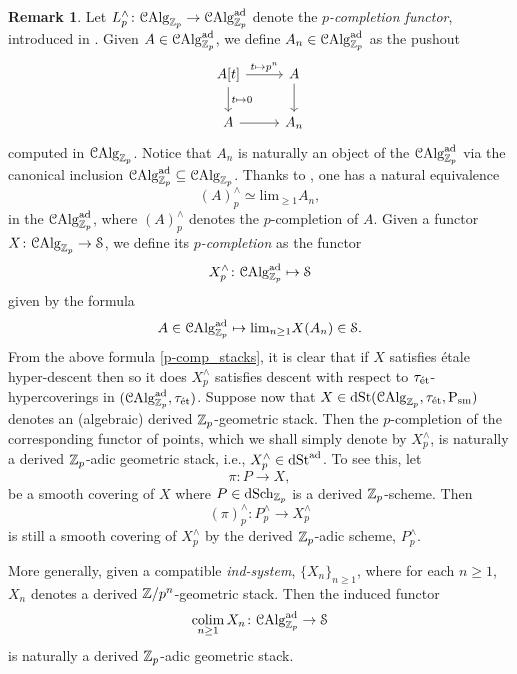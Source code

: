\documentclass[10pt,a4paper]{amsart}
\numberwithin{equation}{subsection}
\theoremstyle{definition}
\newtheorem{remark}[theorem]{Remark}
\def\lim{\mathrm{lim}}
\begin{document}
\begin{remark}
    Let $
            L_p^\wedge \colon \mathcal{C}\mathrm{Alg}_{\mathbb Z_p} \to \mathcal C \mathrm{Alg}^{\mathrm{ad}}_{\mathbb Z_p}
        $
    denote the \emph{$p$-completion functor}, introduced in \cite[\S 8]{lurie2016spectral}. Given $A \in \mathcal C \mathrm{Alg}^{\mathrm{ad}}_{\mathbb Z_p}$, we define $A_n \in \mathcal C \mathrm{Alg}^{\mathrm{ad}}_{\mathbb Z_p}$ as the pushout
        \[
        \begin{tikzcd}
            A[t] \ar{r}{t \mapsto p^n} \ar{d}{t \mapsto 0} & A \ar{d} \\
            A \ar{r} & A_n
        \end{tikzcd}
        \]    
    computed in \infcat $\mathcal{C}\mathrm{Alg}_{\mathbb Z_p}$. Notice that $A_n$ is naturally an object of the \infcat $\mathcal C \mathrm{Alg}^{\mathrm{ad}}_{\mathbb Z_p}$ via the canonical inclusion $\mathcal C \mathrm{Alg}^{\mathrm{ad}}_{\mathbb Z_p} \subseteq \mathcal{C}\mathrm{Alg}_{\mathbb Z_p}$.
    Thanks to \cite[Lemma 8.1.2.3]{lurie2016spectral}, one has a natural equivalence
        \[
            (A)^\wedge_p \simeq \lim_{\geq 1} A_n,  
        \]
    in the \infcat $\mathcal C \mathrm{Alg}^{\mathrm{ad}}_{\mathbb Z_p}$, where $(A)^\wedge_p$ denotes the $p$-completion of $A$.
    Given a functor $X \colon \mathcal{C}\mathrm{Alg}_{\mathbb Z_p} \to \mathcal S$, we define its \emph{$p$-completion} as the functor
        \[
                X^\wedge_p \colon \mathcal C \mathrm{Alg}^{\mathrm{ad}}_{\mathbb Z_p} \mapsto \mathcal S  
        \]
    given by the formula
        \begin{equation} \label{p-comp_stacks}
                A \in \adCAlg \mapsto \lim_{n \geq 1} X(A_n) \in \cS.  
        \end{equation}
    From the above formula \eqref{p-comp_stacks}, it is clear that if $X$ satisfies \'etale hyper-descent then so it does $X^\wedge_p$ satisfies descent with respect to $\tau_{\text{\'et}}$-hypercoverings in $(\mathcal C \mathrm{Alg}^{\mathrm{ad}}_{\mathbb Z_p}, \tau_{\text{\'et}})$.
    Suppose now that $X \in \mathrm{dSt}( \mathcal{C}\mathrm{Alg}_{\mathbb Z_p}, \tau_{\text{\'et}}, \mathrm P_{\mathrm{sm}})$ denotes an (algebraic) derived $\mathbb Z_p$-geometric stack. Then the $p$-completion of the corresponding functor of points,
    which we shall simply denote by $X^\wedge_p$, is naturally a derived $\mathbb Z_p$-adic geometric stack, i.e., $X^\wedge_p \in \mathrm{dSt}^{\mathrm{ad}}$.
    To see this, let
        \[
                \pi \colon P \to X  ,
        \]
    be a smooth covering of $X$ where $P \in \mathrm{dSch}_{\mathbb Z_p}$ is a derived $\mathbb Z_p$-scheme. Then
        \[
                (
                \pi
                )^\wedge_p \colon P^\wedge_p \to X^\wedge_p  
        \]
    is still a smooth covering of $X^\wedge_p$ by the derived $\mathbb Z_p$-adic scheme, $P^\wedge_p$.

    More generally, given a compatible \emph{ind-system}, $\{X_n \}_{n \geq 1}$, where for each $n \geq 1$, $X_n$ denotes a derived $\mathbb Z/p^n$-geometric stack. Then the induced functor
        \[
            \operatorname*{colim}_{n \geq 1} X_n \colon \mathcal C \mathrm{Alg}^{\mathrm{ad}}_{\mathbb Z_p} \to \mathcal S  
        \]
    is naturally a derived $\mathbb Z_p$-adic geometric stack.
\end{remark}
\end{document}
